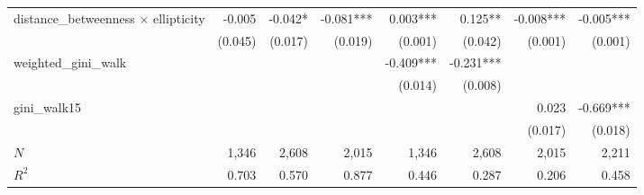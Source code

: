 \begin{tabular}{lrrrrrrr}
distance\_betweenness $\times$ ellipticity &                       -0.005 &                    -0.042* &                    -0.081*** &                         0.003*** &                        0.125** &                                                         -0.008*** &                                           -0.005*** \\ 
                                           &                      (0.045) &                    (0.017) &                      (0.019) &                          (0.001) &                        (0.042) &                                                           (0.001) &                                             (0.001) \\ 
weighted\_gini\_walk                       &                              &                            &                              &                        -0.409*** &                      -0.231*** &                                                                   &                                                     \\ 
                                           &                              &                            &                              &                          (0.014) &                        (0.008) &                                                                   &                                                     \\ 
gini\_walk15                               &                              &                            &                              &                                  &                                &                                                             0.023 &                                           -0.669*** \\ 
                                           &                              &                            &                              &                                  &                                &                                                           (0.017) &                                             (0.018) \\ 
\midrule
$N$                                        &                        1,346 &                      2,608 &                        2,015 &                            1,346 &                          2,608 &                                                             2,015 &                                               2,211 \\ 
$R^2$                                      &                        0.703 &                      0.570 &                        0.877 &                            0.446 &                          0.287 &                                                             0.206 &                                               0.458 \\ 
\bottomrule
\end{tabular}

